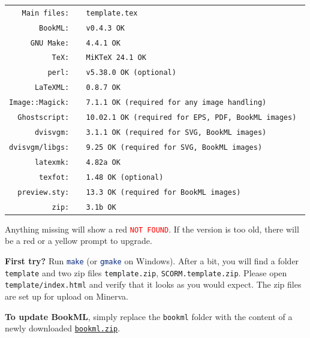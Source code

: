 \documentclass[a4paper,british]{article}
\def\cmdinline{\lstinline[language=bash,frame=none]}
\begin{document}
\begin{tabular}[h]{>{\color{MidnightBlue}\tt}r@{\texttt{\ }}>{\tt}l}
  Main files:    & \color{OliveGreen} template.tex                               \\
  BookML:        & \color{OliveGreen} v0.4.3 OK                                               \\
  GNU Make:      & \color{OliveGreen} 4.4.1 OK                                                \\
  TeX:           & \color{OliveGreen} MiKTeX 24.1 OK                            \\
  perl:          & \textcolor{OliveGreen}{v5.38.0 OK} (optional)                            \\
  LaTeXML:       & \color{OliveGreen} 0.8.7 OK                                              \\
  Image::Magick: & \textcolor{OliveGreen}{7.1.1 OK} (required for any image handling)      \\
  Ghostscript:   & \textcolor{OliveGreen}{10.02.1 OK} (required for EPS, PDF, BookML images) \\
  dvisvgm:       & \textcolor{OliveGreen}{3.1.1 OK} (required for SVG, BookML images)      \\
  dvisvgm/libgs: & \textcolor{OliveGreen}{9.25 OK} (required for SVG, BookML images)      \\
  latexmk:       & \color{OliveGreen} 4.82a OK                                             \\
  texfot:        & \textcolor{OliveGreen}{1.48 OK} (optional)                               \\
  preview.sty:   & \textcolor{OliveGreen}{13.3 OK} (required for BookML images)             \\
  zip:           & \color{OliveGreen} 3.1b OK
\end{tabular}

Anything missing will show a red \textcolor{red}{\tt NOT FOUND}. If the version is too old, there will be a red or a yellow prompt to upgrade.

\textbf{First try?} Run \cmdinline|make| (or \cmdinline|gmake| on Windows). After a bit, you will find a folder \texttt{template} and two zip files \texttt{template.zip}, \texttt{SCORM.template.zip}. Please open \texttt{template/index.html} and verify that it looks as you would expect. The zip files are set up for upload on Minerva.

\textbf{To update BookML}, simply replace the \texttt{bookml} folder with the content of a newly downloaded \href{https://github.com/vlmantova/bookml/releases/latest/download/bookml.zip}{\texttt{bookml.zip}}.
\end{document}

